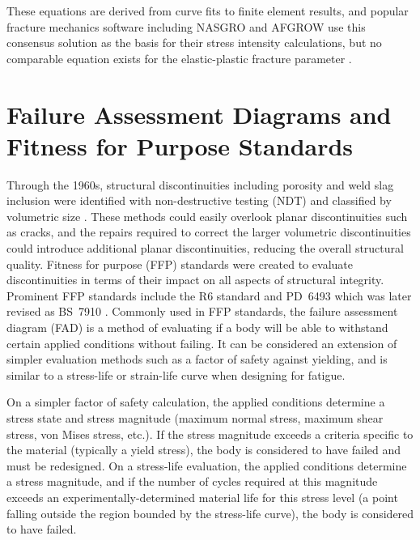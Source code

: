 \endgroup
These equations are derived from curve fits to finite element results, and popular fracture mechanics software including NASGRO and AFGROW use this consensus solution as the basis for their stress intensity calculations, but no comparable equation exists for the elastic-plastic fracture parameter \J.

\section{Failure Assessment Diagrams and Fitness for Purpose Standards}

Through the 1960s, structural discontinuities including porosity and weld slag inclusion were identified with non-destructive testing (NDT) and classified by volumetric size \citep{WIESNER2000883}.
These methods could easily overlook planar discontinuities such as cracks, and the repairs required to correct the larger volumetric discontinuities could introduce additional planar discontinuities,
reducing the overall structural quality.
Fitness for purpose (FFP) standards were created to evaluate discontinuities
in terms of their impact on all aspects of structural integrity.
Prominent FFP standards include the R6 standard \citep{r6-1976} and PD~6493 \citep{pd6493-1991} which was later revised as BS~7910 \citep{bs7910-1999}.
Commonly used in FFP standards, the failure assessment diagram (FAD) is a method of evaluating if a body will be able to withstand certain applied conditions without failing.
It can be considered an extension of simpler evaluation methods such as a factor of safety against yielding, and is similar to a stress-life or strain-life curve when designing for fatigue.

On a simpler factor of safety calculation, the applied conditions determine a stress state and stress magnitude (maximum normal stress, maximum shear stress, von Mises stress, etc.).
If the stress magnitude exceeds a criteria specific to the material (typically a yield stress), the body is considered to have failed and must be redesigned.
On a stress-life evaluation, the applied conditions determine a stress magnitude, and if the number of cycles required at this magnitude exceeds an experimentally-determined material life for this stress level (a point falling outside the region bounded by the stress-life curve), the body is considered to have failed.

